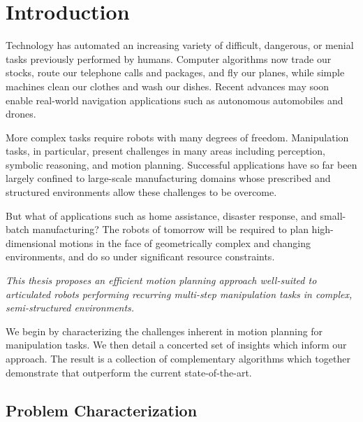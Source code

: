 \chapter{Introduction}
\label{chap:intro}


Technology has automated an increasing variety of
difficult, dangerous, or menial tasks
previously performed by humans.
Computer algorithms now trade our stocks,
route our telephone calls and packages,
and fly our planes,
while simple machines clean our clothes and wash our dishes.
Recent advances may soon enable real-world navigation applications
such as autonomous automobiles and drones.

More complex tasks require robots with many degrees of freedom.
Manipulation tasks, in particular,
present challenges in many areas including
perception, symbolic reasoning, and motion planning.
Successful applications have so far been largely
confined to large-scale manufacturing domains
whose prescribed and structured environments
allow these challenges to be overcome.

But what of applications such as
home assistance, disaster response, and small-batch manufacturing?
The robots of tomorrow will be required to plan
high-dimensional motions
in the face of geometrically complex and changing environments,
and do so under significant resource constraints.


\vspace{0.2cm}
\begin{adjustwidth}{0.2in}{0.1in}
\emph{\large%
This thesis proposes an
efficient motion planning approach
well-suited
to articulated robots
performing recurring multi-step manipulation tasks
in complex, semi-structured environments.
}
\end{adjustwidth}
\vspace{0.2cm}

We begin by characterizing the challenges inherent in
motion planning for manipulation tasks.
We then detail a concerted set of insights which inform our approach.
The result is a collection of complementary algorithms
which together demonstrate that outperform
the current state-of-the-art.

\section{Problem Characterization}

